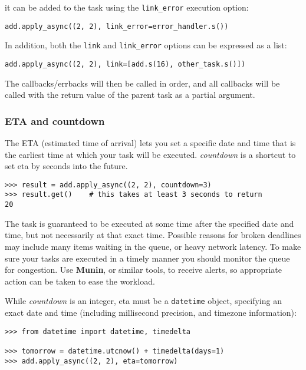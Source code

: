 \documentclass[9pt,a4paper]{article}
\begin{document}
\begin{CJK*}{GBK}{kai}
it can be added to the task using the \verb"link_error" execution option:

\begin{Verbatim}[frame=single]
add.apply_async((2, 2), link_error=error_handler.s())
\end{Verbatim}

In addition, both the \verb"link" and \verb"link_error" options can be expressed as a list:

\begin{Verbatim}[frame=single]
add.apply_async((2, 2), link=[add.s(16), other_task.s()])
\end{Verbatim}

The callbacks/errbacks will then be called in order, and all callbacks will be called with the return value of the parent task as a partial argument.

\subsubsection{ETA and countdown}

The ETA (estimated time of arrival) lets you set a specific date and time that is the earliest time at which your task will be executed. \textit{countdown} is a shortcut to set eta by seconds into the future.

\begin{Verbatim}[frame=single]
>>> result = add.apply_async((2, 2), countdown=3)
>>> result.get()    # this takes at least 3 seconds to return
20
\end{Verbatim}

The task is guaranteed to be executed at some time after the specified date and time, but not necessarily at that exact time. Possible reasons for broken deadlines may include many items waiting in the queue, or heavy network latency. To make sure your tasks are executed in a timely manner you should monitor the queue for congestion. Use \textbf{Munin}, or similar tools, to receive alerts, so appropriate action can be taken to ease the workload.

While \textit{countdown} is an integer, eta must be a \verb"datetime" object, specifying an exact date and time (including millisecond precision, and timezone information):

\begin{Verbatim}[frame=single]
>>> from datetime import datetime, timedelta

>>> tomorrow = datetime.utcnow() + timedelta(days=1)
>>> add.apply_async((2, 2), eta=tomorrow)
\end{Verbatim}


\end{CJK*}
\end{document}
